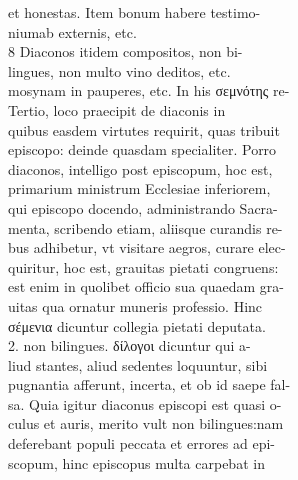 \documentclass{article}
\begin{document}
\begin{pages}
                et honestas. Item bonum habere testimo- \\
                niumab externis, etc. \\
                8 Diaconos itidem compositos, non bi- \\
                lingues, non multo vino deditos, etc. \\
                mosynam in pauperes, etc. In his σεμνότης re- \\
                Tertio, loco praecipit de diaconis in \\
                quibus easdem virtutes requirit, quas tribuit \\
                episcopo: deinde quasdam specialiter. Porro \\
                diaconos, intelligo post episcopum, hoc est, \\
                primarium ministrum Ecclesiae inferiorem, \\
                qui episcopo docendo, administrando Sacra- \\
                menta, scribendo etiam, aliisque curandis re- \\
                bus adhibetur, vt visitare aegros, curare elec- \\
                quiritur, hoc est, grauitas pietati congruens: \\
                est enim in quolibet officio sua quaedam gra- \\
                uitas qua ornatur muneris professio. Hinc \\
                σέμενια dicuntur collegia pietati deputata. \\
                2. non bilingues. δίλογοι dicuntur qui a- \\
                liud stantes, aliud sedentes loquuntur, sibi \\
                pugnantia afferunt, incerta, et ob id saepe fal- \\
                sa. Quia igitur diaconus episcopi est quasi o- \\
                culus et auris, merito vult non bilingues:nam \\
                deferebant populi peccata et errores ad epi- \\
                scopum, hinc episcopus multa carpebat in \\

\end{pages}
\end{document}
